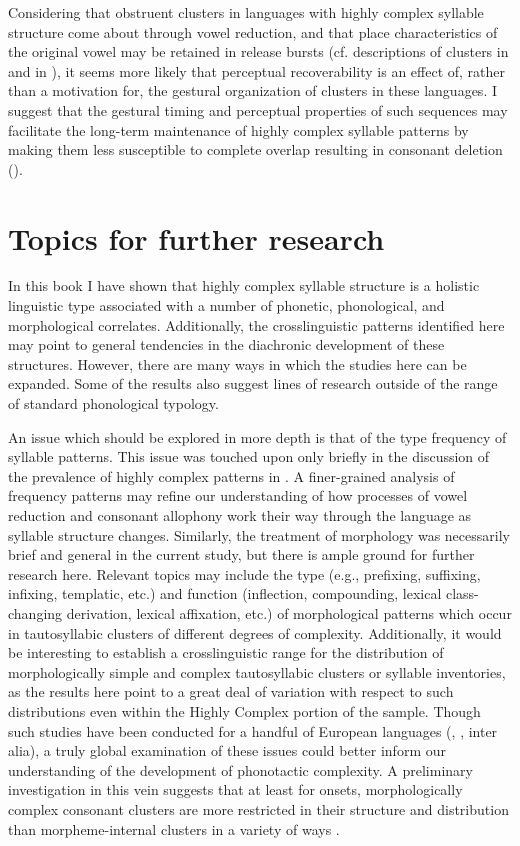   Considering that obstruent clusters in languages with highly complex syllable structure come about through vowel reduction, and that place characteristics of the original vowel may be retained in release bursts (cf. descriptions of clusters in  and  in ), it seems more likely that perceptual recoverability is an effect of, rather than a motivation for, the gestural organization of clusters in these languages. I suggest that the gestural timing and perceptual properties of such sequences may facilitate the long-term maintenance of highly complex syllable patterns by making them less susceptible to complete overlap resulting in consonant deletion (\citealt{BrowmanGoldstein1990}).

\section{Topics for further research}\label{sec:8.6}

  In this book I have shown that highly complex syllable structure is a holistic linguistic type associated with a number of phonetic, phonological, and morphological correlates. Additionally, the crosslinguistic patterns identified here may point to general tendencies in the diachronic development of these structures. However, there are many ways in which the studies here can be expanded. Some of the results also suggest lines of research outside of the range of standard phonological typology.

  An issue which should be explored in more depth is that of the type frequency of syllable patterns. This issue was touched upon only briefly in the discussion of the prevalence of highly complex patterns in . A finer-grained analysis of frequency patterns may refine our understanding of how processes of vowel reduction and consonant allophony work their way through the language as syllable structure changes. Similarly, the treatment of morphology was necessarily brief and general in the current study, but there is ample ground for further research here. Relevant topics may include the type (e.g., prefixing, suffixing, infixing, templatic, etc.) and function (inflection, compounding, lexical class-changing derivation, lexical affixation, etc.) of morphological patterns which occur in tautosyllabic clusters of different degrees of complexity. Additionally, it would be interesting to establish a crosslinguistic range for the distribution of morphologically simple and complex tautosyllabic clusters or syllable inventories, as the results here point to a great deal of variation with respect to such distributions even within the Highly Complex portion of the sample. Though such studies have been conducted for a handful of European languages (\citealt{DresslerDziubalska-Kołaczyk2006}, \citealt{DresslerEtAl2010}, inter alia), a truly global examination of these issues could better inform our understanding of the development of phonotactic complexity. A preliminary investigation in this vein suggests that at least for onsets, morphologically complex consonant clusters are more restricted in their structure and distribution than morpheme-internal clusters in a variety of ways \citep{Easterday2019}.

